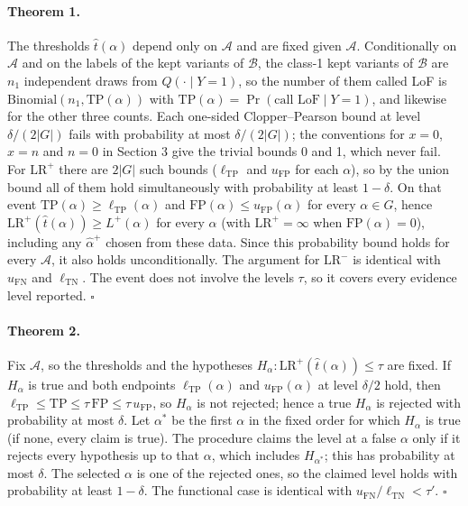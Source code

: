 \paragraph{Theorem 1.}
The thresholds $\hat t(\alpha)$ depend only on $\mathcal A$ and are fixed given $\mathcal A$. Conditionally on
$\mathcal A$ and on the labels of the kept variants of $\mathcal B$, the class-1 kept variants of $\mathcal B$ are
$n_1$ independent draws from $Q(\cdot\mid Y=1)$, so the number of them called LoF is
$\mathrm{Binomial}(n_1,\mathrm{TP}(\alpha))$ with $\mathrm{TP}(\alpha)=\Pr(\text{call LoF}\mid Y=1)$, and likewise for the
other three counts. Each one-sided Clopper--Pearson bound \cite{ClopperPearson1934} at level $\delta/(2|G|)$ fails with
probability at most $\delta/(2|G|)$; the conventions for $x=0$, $x=n$ and $n=0$ in Section 3 give the trivial
bounds 0 and 1, which never fail. For $\mathrm{LR}^+$ there are $2|G|$ such bounds ($\ell_{\mathrm{TP}}$ and
$u_{\mathrm{FP}}$ for each $\alpha$), so by the union bound all of them hold simultaneously with probability at
least $1-\delta$. On that event $\mathrm{TP}(\alpha)\ge\ell_{\mathrm{TP}}(\alpha)$ and
$\mathrm{FP}(\alpha)\le u_{\mathrm{FP}}(\alpha)$ for every $\alpha\in G$, hence
$\mathrm{LR}^+(\hat t(\alpha))\ge L^+(\alpha)$ for every $\alpha$ (with $\mathrm{LR}^+=\infty$ when
$\mathrm{FP}(\alpha)=0$), including any $\hat\alpha^+$ chosen from these data. Since this probability bound holds for
every $\mathcal A$, it also holds unconditionally. The argument for $\mathrm{LR}^-$ is identical with $u_{\mathrm{FN}}$ and $\ell_{\mathrm{TN}}$.
The event does not involve the levels $\tau$, so it covers every evidence level reported. \hfill$\square$

\paragraph{Theorem 2.}
Fix $\mathcal A$, so the thresholds and the hypotheses $H_\alpha:\mathrm{LR}^+(\hat t(\alpha))\le\tau$ are fixed. If
$H_\alpha$ is true and both endpoints $\ell_{\mathrm{TP}}(\alpha)$ and $u_{\mathrm{FP}}(\alpha)$ at level $\delta/2$
hold, then $\ell_{\mathrm{TP}}\le\mathrm{TP}\le\tau\,\mathrm{FP}\le\tau\,u_{\mathrm{FP}}$, so $H_\alpha$ is not rejected;
hence a true $H_\alpha$ is rejected with probability at most $\delta$. Let $\alpha^*$ be the first $\alpha$ in the fixed
order for which $H_\alpha$ is true (if none, every claim is true). The procedure claims the level at a false $\alpha$
only if it rejects every hypothesis up to that $\alpha$, which includes $H_{\alpha^*}$; this has probability at most
$\delta$. The selected $\alpha$ is one of the rejected ones, so the claimed level holds with probability at least
$1-\delta$. The functional case is identical with $u_{\mathrm{FN}}/\ell_{\mathrm{TN}}<\tau'$. \hfill$\square$

